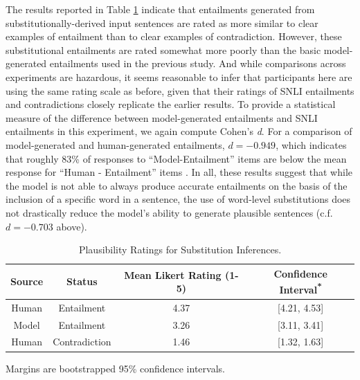 \documentclass[utf8]{frontiersSCNS} %
\begin{document}
The results reported in Table \ref{sub_ratings} indicate that entailments generated from substitutionally-derived input sentences are rated as more similar to clear examples of entailment than to clear examples of contradiction. However, these substitutional entailments are rated somewhat more poorly than the basic model-generated entailments used in the previous study. And while comparisons across experiments are hazardous, it seems reasonable to infer that participants here are using the same rating scale as before, given that their ratings of SNLI entailments and contradictions closely replicate the earlier results. To provide a statistical measure of the difference between model-generated entailments and SNLI entailments in this experiment, we again compute Cohen's \textit{d}. For a comparison of model-generated and human-generated entailments, $d = -0.949$, which indicates that roughly 83\% of responses to ``Model-Entailment'' items are below the mean response for ``Human - Entailment'' items \citep{Becker:2000}. In all, these results suggest that while the model is not able to always produce accurate entailments on the basis of the inclusion of a specific word in a sentence, the use of word-level substitutions does not drastically reduce the model's ability to generate plausible sentences (c.f. $d = -0.703$ above).

\begin{table}[!t]
\begin{center} 
\begin{threeparttable}

\setlength{\tabcolsep}{16pt}

\caption{Plausibility Ratings for Substitution Inferences.} 
\label{sub_ratings} 

\vskip 0.12in

\begin{tabular}{c c c c} 
\hline
Source & Status &  Mean Likert Rating (1-5) & Confidence Interval\textsuperscript{*} \\
\hline
\rule{0pt}{3ex}Human & Entailment  &  4.37  & [4.21, 4.53] \\
Model & Entailment  &  3.26  & [3.11, 3.41] \\
Human & Contradiction & 1.46 & [1.32, 1.63] \\

\hline
\end{tabular}
\begin{tablenotes}
      \footnotesize
      \item\centering * Margins are bootstrapped 95\% confidence intervals.
\end{tablenotes}

\end{threeparttable}
\end{center} 
\end{table}
\end{document}
